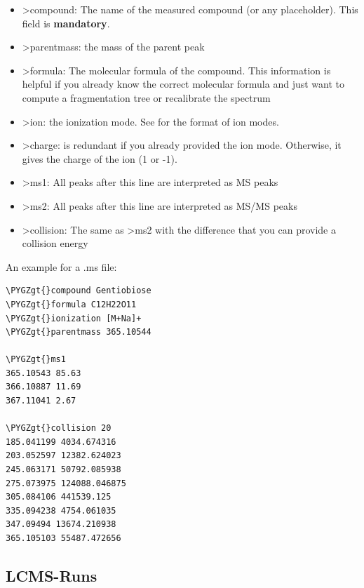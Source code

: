 \documentclass[letterpaper,10pt,openany,oneside]{sphinxmanual}
\def\PYGZgt{\char`\>}
\begin{document}
\begin{itemize}
	\item {} 
	\textgreater{}compound: The name of the measured compound (or any placeholder). This field is \textbf{mandatory}.
	
	\item {} 
	\textgreater{}parentmass: the mass of the parent peak
	
	\item {} 
	\textgreater{}formula: The molecular formula of the compound. This
	information is helpful if you already know the correct molecular formula and
	just want to compute a fragmentation tree or recalibrate the spectrum
	
	\item {} 
	\textgreater{}ion: the ionization mode. See {\hyperref[commandline:ions]{}} for the format of ion modes.
	
	\item {} 
	\textgreater{}charge: is redundant if you already provided the ion mode. Otherwise, it gives the charge of the ion (1 or -1).
	
	\item {} 
	\textgreater{}ms1: All peaks after this line are interpreted as MS peaks
	
	\item {} 
	\textgreater{}ms2: All peaks after this line are interpreted as MS/MS peaks
	
	\item {} 
	\textgreater{}collision: The same as \textgreater{}ms2 with the difference that you can provide a collision energy
	
\end{itemize}

An example for a .ms file:

\begin{Verbatim}[commandchars=\\\{\}]
\PYGZgt{}compound Gentiobiose
\PYGZgt{}formula C12H22O11
\PYGZgt{}ionization [M+Na]+
\PYGZgt{}parentmass 365.10544

\PYGZgt{}ms1
365.10543 85.63
366.10887 11.69
367.11041 2.67

\PYGZgt{}collision 20
185.041199 4034.674316
203.052597 12382.624023
245.063171 50792.085938
275.073975 124088.046875
305.084106 441539.125
335.094238 4754.061035
347.09494 13674.210938
365.105103 55487.472656
\end{Verbatim}

\subsection{LCMS-Runs}
\end{document}
